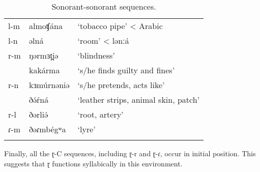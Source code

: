 \begin{table}
  \begin{tabular}{lll}
    \lsptoprule
l-m	&		almoʧána	&	‘tobacco pipe’	\hspace{0.8cm}< Arabic		\\
l-n	&		əlná		&	‘room’		\hspace{1.95cm}< lənːá		\\
r-m	&		ŋərmɜt̪iə	&	‘blindness’\\
	&		kakárma		&	‘s/he finds guilty and fines’\\
r-n	&		kɜmúrnəniə	&	‘s/he pretends, acts like’\\
	&		ðə́ŕná		&	‘leather strips, animal skin, patch’\\
r-l	&		ðərliə́		&	‘root, artery’\\
ɾ-m	& 		ðəɾmbégʷa	&	‘lyre’\\
\lspbottomrule
  \end{tabular}
  \caption{Sonorant-sonorant sequences.}
  \label{tab:ch3:2}
\end{table}

Finally, all the ɽ-C sequences, including ɽ-r and ɽ-ɾ, occur in initial position. This suggests that ɽ functions syllabically in this environment. 

